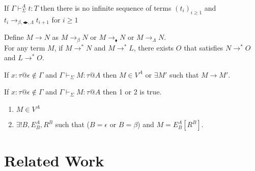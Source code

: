 \documentclass[runningheads]{llncs}
\newcommand{\G}{\Gamma}
\newcommand{\V}{\vdash_\Sigma}
\newcommand{\TB}{\blacktriangleright}
\newcommand{\TBL}{\blacktriangleleft}
\begin{document}
\begin{theorem}
	If $\G\V^A t:T$ then there is no infinite sequence of terms $(t_i)_{i\ge1}$ and $t_i \longrightarrow_{\beta, \TBL \TB,\Lambda} t_{i+1}$ for $i\ge 1$
\end{theorem}

\begin{theorem}
	Define $M \longrightarrow N$ as $M \longrightarrow_{\beta} N$ or $M\longrightarrow_\blacklozenge N$ or  $M \longrightarrow_{\Lambda} N$.\\
	For any term $M$, if $M \longrightarrow^* N$ and $M \longrightarrow^* L$,
	there exists $O$ that satisfies $N \longrightarrow^* O$ and $L \longrightarrow^* O$.
\end{theorem}

\begin{theorem}[Progress]
	If $x:\tau @\epsilon \notin \G$ and $\G \V M : \tau  @ A$ then $ M \in V^A $ or $\exists M'$ such that $M \longrightarrow M'$.
\end{theorem}

\begin{theorem}
	If $x:\tau@\epsilon \notin \G$ and $\G \V M : \tau @ A$ then 1 or 2 is true.
	\begin{enumerate}
		\item $ M \in V^A$
		\item $\exists ! B, E^A_B, R^B$ such that ($B = \epsilon$ or $B = \beta$) and $M = E^A_B[R^B]$.
	\end{enumerate}
\end{theorem}

\section{Related Work}
\end{document}
